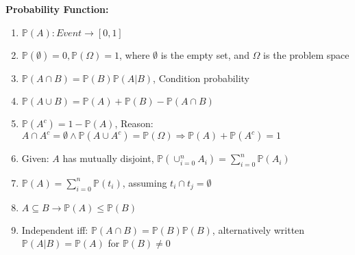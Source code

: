 \documentclass[12pt]{article}
\renewcommand{\=}[1]{\stackrel{#1}{=}} %
\theoremstyle{definition}
\theoremstyle{remark}
\begin{document}
\textbf{Probability Function:}
\begin{enumerate}
\item $\mathbb{P}(A):Event\rightarrow [0,1]$
\item $\mathbb{P}(\emptyset) = 0, \mathbb{P}(\Omega)=1$, where
  $\emptyset$ is the empty set, and $\Omega$ is the problem space
\item $\mathbb{P}(A\cap B) = \mathbb{P}(B)\mathbb{P}(A | B)$,
  Condition probability
\item $\mathbb{P}(A\cup B) = \mathbb{P}(A) + \mathbb{P}(B) -
  \mathbb{P}(A\cap B)$
\item $\mathbb{P}(A^c) = 1-\mathbb{P}(A)$, Reason: $A\cap A^c =
  \emptyset \wedge \mathbb{P}(A\cup A^c) = \mathbb{P}(\Omega)
  \Rightarrow \mathbb{P}(A)+\mathbb{P}(A^c) = 1$
\item Given: $A$ has mutually disjoint, $\mathbb{P}(\cup_{i=0}^n
  A_i) = \sum_{i=0}^n\mathbb{P}(A_i) $
\item $\mathbb{P}(A)=\sum_{i=0}^n\mathbb{P}({t_i})$, assuming ${t_i}\cap {t_j} = \emptyset$
\item $A\subseteq B \rightarrow \mathbb{P}(A)\leq \mathbb{P}(B)$
\item Independent iff: $\mathbb{P}(A\cap B) =
  \mathbb{P}(B)\mathbb{P}(B)$, alternatively written
  $\mathbb{P}(A|B) = \mathbb{P}(A)$ for $\mathbb{P}(B) \neq 0$ 
\end{enumerate}
\end{document}
